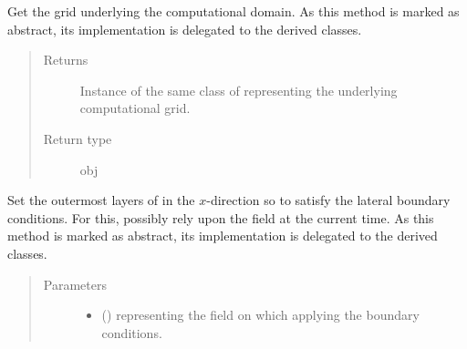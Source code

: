 \documentclass[letterpaper,10pt,english]{sphinxmanual}
\begin{document}
\begin{fulllineitems}
\begin{fulllineitems}
\end{fulllineitems}


\begin{fulllineitems}
\label{\detokenize{api:tasmania.dycore.horizontal_boundary.HorizontalBoundary.get_computational_grid}}
Get the  grid underlying the computational domain.
As this method is marked as abstract, its implementation is delegated to the derived classes.
\begin{quote}\begin{description}
\item[{Returns}] \leavevmode
Instance of the same class of 
representing the underlying computational grid.

\item[{Return type}] \leavevmode
obj

\end{description}\end{quote}

\end{fulllineitems}


\begin{fulllineitems}
\label{\detokenize{api:tasmania.dycore.horizontal_boundary.HorizontalBoundary.set_outermost_layers_x}}
Set the outermost layers of  in the \(x\)-direction so to satisfy
the lateral boundary conditions. For this, possibly rely upon the field  at the current time.
As this method is marked as abstract, its implementation is delegated to the derived classes.
\begin{quote}\begin{description}
\item[{Parameters}] \leavevmode\begin{itemize}
\item {} 
 () \textendash{}  representing the field on which applying the boundary conditions.


\end{itemize}
\end{description}
\end{quote}
\end{fulllineitems}
\end{fulllineitems}
\end{document}

